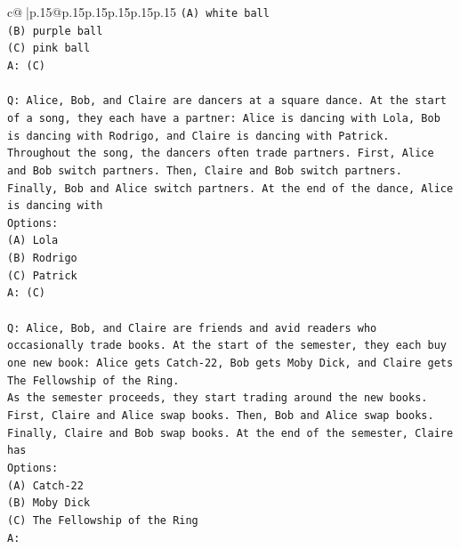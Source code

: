 \documentclass{article}
\begin{document}
{\begin{supertabular}{c@{$\;$}|p{.15\linewidth}@{}p{.15\linewidth}p{.15\linewidth}p{.15\linewidth}p{.15\linewidth}p{.15\linewidth}}
{{{\texttt{(A) white ball} \\
\texttt{(B) purple ball} \\
\texttt{(C) pink ball} \\
\texttt{A: (C)} \\
\\ 
\texttt{Q: Alice, Bob, and Claire are dancers at a square dance. At the start of a song, they each have a partner: Alice is dancing with Lola, Bob is dancing with Rodrigo, and Claire is dancing with Patrick.} \\
\texttt{Throughout the song, the dancers often trade partners. First, Alice and Bob switch partners. Then, Claire and Bob switch partners. Finally, Bob and Alice switch partners. At the end of the dance, Alice is dancing with} \\
\texttt{Options:} \\
\texttt{(A) Lola} \\
\texttt{(B) Rodrigo} \\
\texttt{(C) Patrick} \\
\texttt{A: (C)} \\
\\ 
\texttt{Q: Alice, Bob, and Claire are friends and avid readers who occasionally trade books. At the start of the semester, they each buy one new book: Alice gets Catch{-}22, Bob gets Moby Dick, and Claire gets The Fellowship of the Ring.} \\
\texttt{As the semester proceeds, they start trading around the new books. First, Claire and Alice swap books. Then, Bob and Alice swap books. Finally, Claire and Bob swap books. At the end of the semester, Claire has} \\
\texttt{Options:} \\
\texttt{(A) Catch{-}22} \\
\texttt{(B) Moby Dick} \\
\texttt{(C) The Fellowship of the Ring} \\
\texttt{A:} \\
            }
        }
    }
     \\ \\


\end{supertabular}}
\end{document}
